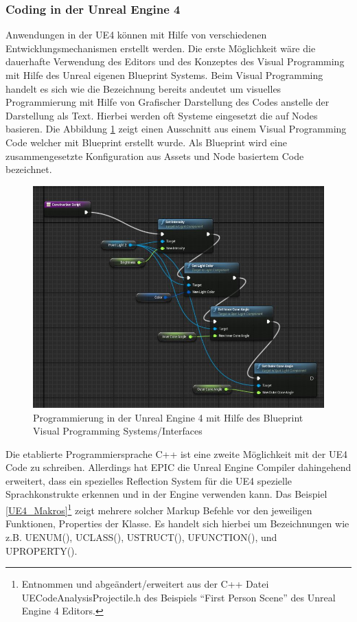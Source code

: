 \documentclass[pagesize, paper=a4, fontsize=12pt, titlepage=true, headings=small, headnosepline, abstractoff, liststotoc, nochapterprefix, plainheadsepline, twoside]{scrreprt}
\begin{document}
\subsubsection{Coding in der Unreal Engine 4}
Anwendungen in der UE4 können mit Hilfe von verschiedenen Entwicklungsmechanismen erstellt werden. Die erste Möglichkeit wäre die dauerhafte Verwendung des Editors und des Konzeptes des Visual Programming mit Hilfe des Unreal eigenen Blueprint Systems. Beim Visual Programming handelt es sich wie die Bezeichnung bereits andeutet um visuelles Programmierung mit Hilfe von Grafischer Darstellung des Codes anstelle der Darstellung als Text. Hierbei werden oft Systeme eingesetzt die auf Nodes basieren. Die Abbildung \ref{UE4Blueprint} zeigt einen Ausschnitt aus einem Visual Programming Code welcher mit Blueprint erstellt wurde. Als Blueprint wird eine zusammengesetzte Konfiguration aus Assets und Node basiertem Code bezeichnet.

\begin{figure}[ht]
	\centering
	\includegraphics[width=\linewidth]{Bilder/ue4Blueprint.jpg}
	\caption{Programmierung in der Unreal Engine 4 mit Hilfe des Blueprint Visual Programming Systems/Interfaces}
	\label{UE4Blueprint}	
\end{figure} 

Die etablierte Programmiersprache C++ ist eine zweite Möglichkeit mit der UE4 Code zu schreiben. Allerdings hat EPIC die Unreal Engine Compiler dahingehend erweitert, dass ein spezielles Reflection System für die UE4 spezielle Sprachkonstrukte erkennen und in der Engine verwenden kann. Das Beispiel \ref{UE4_Makros}\footnote{Entnommen und abgeändert/erweitert aus der C++ Datei UECodeAnalysisProjectile.h des Beispiels “First Person Scene” des Unreal Engine 4 Editors.} zeigt mehrere solcher Markup Befehle vor den jeweiligen Funktionen, Properties der Klasse. Es handelt sich hierbei um Bezeichnungen wie z.B. UENUM(), UCLASS(), USTRUCT(), UFUNCTION(), und UPROPERTY().
\end{document}
